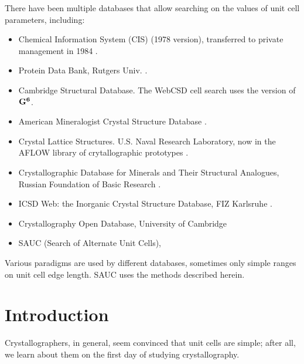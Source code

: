 \documentclass[preprint]{iucr}              %
\numberwithin{equation}{section}
\newcommand{\GVI}[0]{$\bf{G^{6}}$}
\begin{document}
	There have been multiple databases that allow searching
	on the values of unit cell parameters, including:
		\begin{itemize}
			\label{databases}
		
		\item Chemical Information System (CIS) (1978 version),
		 transferred to private management in 1984 \cite{kadec1985transfer}.
		 
		\item Protein Data Bank, Rutgers Univ. \cite{Bernstein1977} \cite{Berman2000}.
		
		\item Cambridge Structural Database.  The WebCSD 
		\cite{hayward2019cambridge}	cell search uses the
		\cite{hayward2019cambridge} version of \GVI{}.
		
		\item American Mineralogist Crystal Structure Database \cite{downs2003american}.
		
		\item Crystal Lattice Structures. U.S. Naval Research Laboratory, now in the
		AFLOW library of crytallographic prototypes \cite{mehl2017aflow}.
		
		\item Crystallographic Database for Minerals and Their Structural Analogues, 
		Russian Foundation of Basic Research
		\cite{chichagov2001mincryst}.
		
		\item ICSD Web: the Inorganic Crystal Structure Database, FIZ Karlsruhe
		\cite{ruhl2019inorganic}.
		
		\item Crystallography Open Database, University of Cambridge \cite{gravzulis2012crystallography} 
		
		\item  SAUC (Search of Alternate Unit Cells),  \cite{McGill2014}
	\end{itemize}

Various paradigms are used 
by different databases, sometimes only simple ranges on unit cell
edge length. SAUC uses the methods described herein.	


	
\section{Introduction}

Crystallographers, in general, seem convinced that unit cells
are simple; after all, we learn about them on the first day of
studying crystallography.
\end{document}
